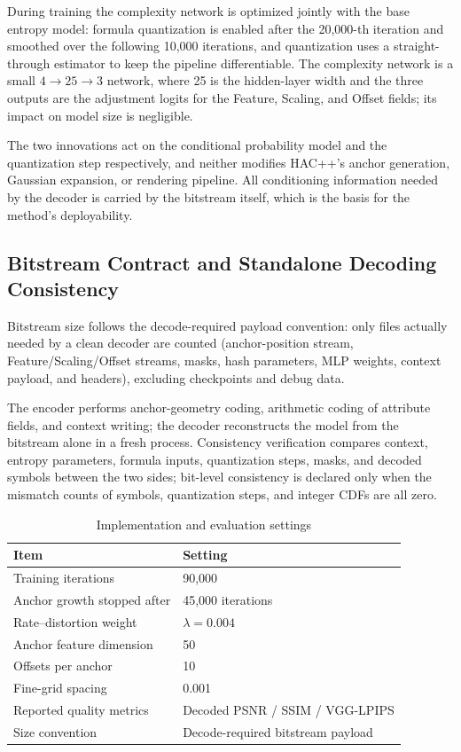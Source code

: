 \documentclass[conference]{IEEEtran}
\begin{document}
During training the complexity network is optimized jointly with the
base entropy model: formula quantization is enabled after the 20,000-th
iteration and smoothed over the following 10,000 iterations, and
quantization uses a straight-through estimator to keep the pipeline
differentiable. The complexity network is a small $4\rightarrow
25\rightarrow 3$ network, where 25 is the hidden-layer width and the
three outputs are the adjustment logits for the Feature, Scaling, and
Offset fields; its impact on model size is negligible.

The two innovations act on the conditional probability model and the
quantization step respectively, and neither modifies HAC++'s anchor
generation, Gaussian expansion, or rendering pipeline. All conditioning
information needed by the decoder is carried by the bitstream itself,
which is the basis for the method's deployability.

\subsection{Bitstream Contract and Standalone Decoding Consistency}
\label{sec:bitstream}
Bitstream size follows the decode-required payload convention: only
files actually needed by a clean decoder are counted (anchor-position
stream, Feature/Scaling/Offset streams, masks, hash parameters, MLP
weights, context payload, and headers), excluding checkpoints and debug
data.

The encoder performs anchor-geometry coding, arithmetic coding of
attribute fields, and context writing; the decoder reconstructs the
model from the bitstream alone in a fresh process. Consistency
verification compares context, entropy parameters, formula inputs,
quantization steps, masks, and decoded symbols between the two sides;
bit-level consistency is declared only when the mismatch counts of
symbols, quantization steps, and integer CDFs are all zero.

\begin{table}[t]
\caption{Implementation and evaluation settings}
\centering
\begin{tabular}{@{}ll@{}}
\toprule
\textbf{Item} & \textbf{Setting} \\
\midrule
Training iterations & 90,000 \\
Anchor growth stopped after & 45,000 iterations \\
Rate--distortion weight & \(\lambda = 0.004\) \\
Anchor feature dimension & 50 \\
Offsets per anchor & 10 \\
Fine-grid spacing & 0.001 \\
Reported quality metrics & Decoded PSNR / SSIM / VGG-LPIPS \\
Size convention & Decode-required bitstream payload \\
\bottomrule
\end{tabular}
\label{tab:settings}
\end{table}
\end{document}
